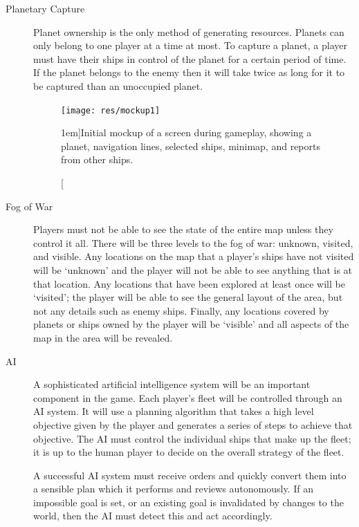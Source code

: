 \begin{description}

	\item[Planetary Capture]

	Planet ownership is the only method of generating resources. Planets can only belong to
	one player at a time at most. To capture a planet, a player must have their ships in control
	of the planet for a certain period of time. If the planet belongs to the enemy then it will
	take twice as long for it to be captured than an unoccupied planet.


\begin{figure}[t!]
	\texttt{[image: res/mockup1]}
	\caption[][1em]{Initial mockup of a screen during gameplay, showing a planet, navigation lines, selected ships, minimap, and reports from other ships.}
	\label{fig:mockup1}
\end{figure}

	\item[Fog of War]

	Players must not be able to see the state of the entire map unless they control it all. There
	will be three levels to the fog of war: unknown, visited, and visible. Any locations on the map
	that a player's ships have not visited will be `unknown' and the player will not be able to see
	anything that is at that location. Any locations that have been explored at least once will be
	`visited'; the player will be able to see the general layout of the area, but not any details
	such as enemy ships. Finally, any locations covered by planets or ships owned by the player will
	be `visible' and all aspects of the map in the area will be revealed.
	
	\item[AI]

	A sophisticated artificial intelligence system will be an important component in the game.
	Each player's fleet will be controlled through an AI system. It will use a planning algorithm
	that takes a high level objective given by the player and generates a series of steps to
	achieve that objective. The AI must control the individual ships that make up the fleet; it
	is up to the human player to decide on the overall strategy of the fleet.

	A successful AI system must receive orders and quickly convert them into a sensible plan which it performs and reviews autonomously. If an impossible goal is set, or an existing goal is
	invalidated by changes to the world, then the AI must detect this and act accordingly.


\end{description}
